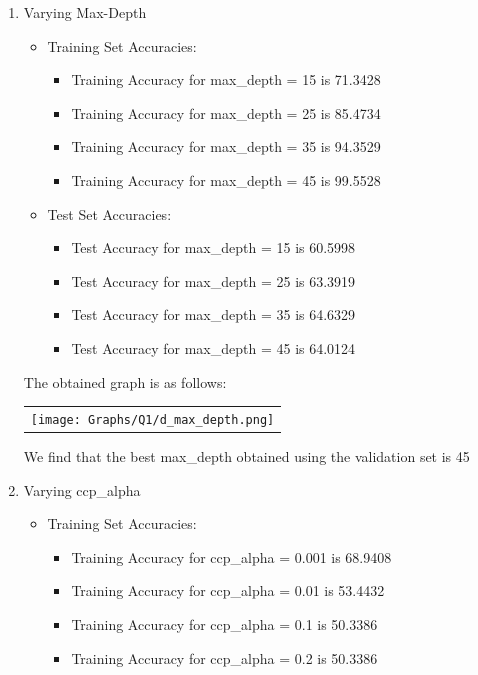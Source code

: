 \begin{enumerate}[label=(\alph*)]
\begin{enumerate}[label=\roman*.]
    \item Varying Max-Depth
    \begin{itemize}
        \item Training Set Accuracies:
        \begin{itemize}
            \item Training Accuracy for max\_depth = 15 is 71.3428
            \item Training Accuracy for max\_depth = 25 is 85.4734
            \item Training Accuracy for max\_depth = 35 is 94.3529
            \item Training Accuracy for max\_depth = 45 is 99.5528
        \end{itemize}
        \item Test Set Accuracies:
        \begin{itemize}
            \item Test Accuracy for max\_depth = 15 is 60.5998
            \item Test Accuracy for max\_depth = 25 is 63.3919
            \item Test Accuracy for max\_depth = 35 is 64.6329
            \item Test Accuracy for max\_depth = 45 is 64.0124
        \end{itemize}
    \end{itemize}
    \newpage
     The obtained graph is as follows:
     \begin{center}
        \begin{tabular}{c}
            \texttt{[image: Graphs/Q1/d\_max\_depth.png]}
        \end{tabular}
    \end{center}
    We find that the best max\_depth obtained using the validation set is 45
    \item Varying ccp\_alpha
    \begin{itemize}
        \item Training Set Accuracies:
        \begin{itemize}
            \item Training Accuracy for ccp\_alpha = 0.001 is 68.9408
            \item Training Accuracy for ccp\_alpha = 0.01 is 53.4432
            \item Training Accuracy for ccp\_alpha = 0.1 is 50.3386
            \item Training Accuracy for ccp\_alpha = 0.2 is 50.3386

\end{itemize}
\end{itemize}
\end{enumerate}
\end{enumerate}
